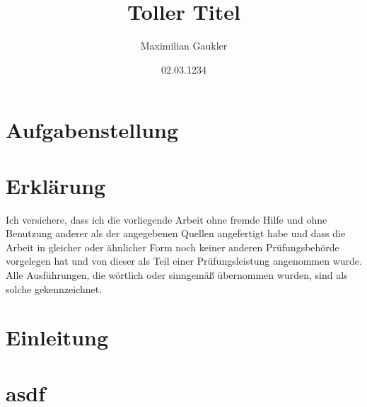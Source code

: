 \documentclass[draft]{max-masterarbeit} %
\title{Toller Titel}
\author{Maximilian Gaukler}
\date{02.03.1234}
\begin{document}
\frontmatter
{} %

\titelseiteLRT
\pagestyle{empty}
\cleardoublepage
\chapter*{Aufgabenstellung}
\thispagestyle{empty}
\cleardoublepage
\chapter*{Erklärung}
\thispagestyle{empty}
Ich versichere, dass ich die vorliegende Arbeit ohne fremde Hilfe und ohne Benutzung anderer als
der angegebenen Quellen angefertigt habe und dass die Arbeit in gleicher oder ähnlicher Form noch
keiner anderen Prüfungsbehörde vorgelegen hat und von dieser als Teil einer Prüfungsleistung
angenommen wurde. Alle Ausführungen, die wörtlich oder sinngemäß übernommen wurden, sind als 
solche gekennzeichnet.

\vspace{4.5em}

\makeatletter
\let\thedate\@date
\let\theauthor\@author
\makeatother
\newcommand{\unterschriftsbreite}{.35\linewidth}
%

\cleardoublepage
{}
\pagestyle{scrheadings}
\tableofcontents



\mainmatter
\chapter{Einleitung}


\chapter{asdf}
\blindtext \cite{beispielquelle}
\end{document}
